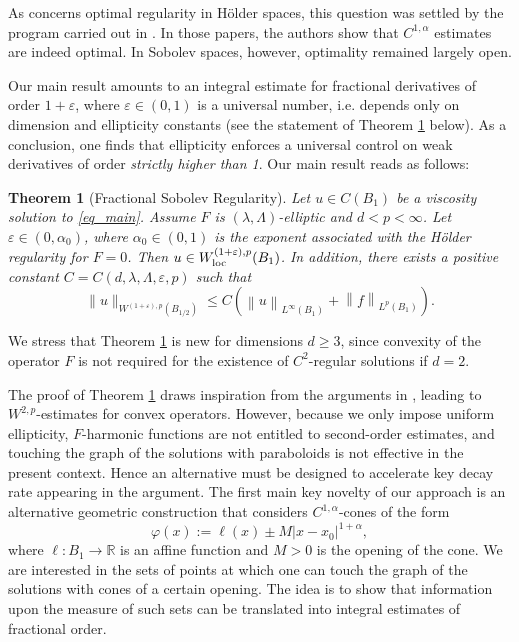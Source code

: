 \documentclass[10pt]{article} %
\newtheorem{teo}{Theorem}
\begin{document}
As concerns optimal regularity in H\"older spaces, this question was settled by the program carried out in \cite{NV1,NV2,NV3,NV4}. In those papers, the authors show that $C^{1,\alpha}$ estimates are indeed optimal. In Sobolev spaces, however, optimality remained largely open.

Our main result amounts to an integral estimate for fractional derivatives of order $1+\varepsilon$, where $\varepsilon\in(0,1)$ is a universal number, i.e. depends only on dimension and ellipticity constants (see the statement of Theorem \ref{theo_main} below). As a conclusion, one finds that ellipticity enforces a universal control on weak derivatives of order \emph{strictly higher than 1}. Our main result reads as follows:

\begin{teo}[Fractional Sobolev Regularity]\label{theo_main}
Let $u \in   C (B_1)$ be a viscosity solution to \eqref{eq_main}. Assume $F$ is $(\lambda, \Lambda)$-elliptic and $d<p < \infty$. Let $\varepsilon\in(0,\alpha_0)$, where $\alpha_0\in(0,1)$ is the exponent associated with the H\"older regularity for $F=0$. Then $u\in W_{\rm loc}^{(1+\varepsilon), p}(B_{1})$. In addition, there exists a positive constant $C=C(d,\lambda,\Lambda, \varepsilon,p)$ such that
\begin{equation}\label{est main thm}
	\|u\|_{W^{(1+\varepsilon), p}({B}_{1/2})} \leq C\left(\left\|u\right\|_{L^\infty(B_1)}+\left\|f\right\|_{L^p(B_1)}\right).
\end{equation}
\end{teo}

We stress that Theorem \ref{theo_main} is new for dimensions $d\geq 3$, since convexity of the operator $F$ is not required for the existence of $C^2$-regular solutions if $d=2$.

The proof of Theorem \ref{theo_main} draws inspiration from the arguments in \cite{caf}, leading to $W^{2,p}$-estimates for convex operators. However, because we only impose uniform ellipticity, $F$-harmonic functions are not entitled to second-order estimates, and touching the graph of the solutions with paraboloids is not effective in the present context. Hence an alternative must be designed to accelerate key decay rate appearing in the argument. The first main key novelty of our approach is an alternative geometric construction that considers $C^{1,\alpha}$-cones of the form
\[
	\varphi(x):=\ell(x)\pm M|x-x_0|^{1+\alpha},
\]
where $\ell \colon B_1\to\mathbb{R}$ is an affine function and $M>0$ is the opening of the cone. We are interested in the sets of points at which one can touch the graph of the solutions with cones of a certain opening. The idea is to show that information upon the measure of such sets can be translated into integral estimates of fractional order. 
\end{document}
